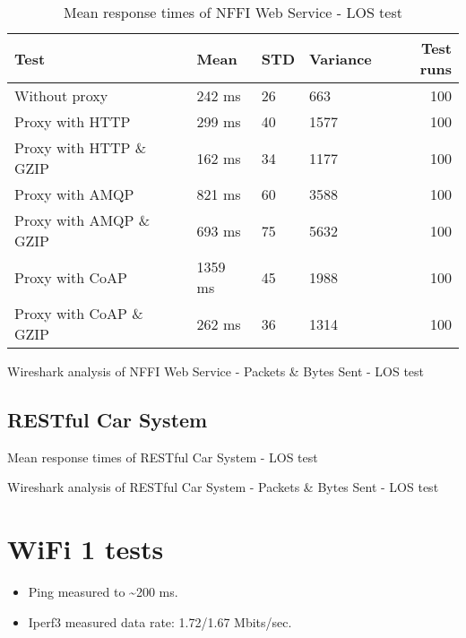 \begin{appendices}
\begin{table}[H]
\begin{tabular}{llllr}
\hline
 Test                   &   Mean &   STD &   Variance &   Test runs \\
\hline
  Without proxy & 242 ms & 26 & 663 & 100 \\
  Proxy with HTTP & 299 ms & 40 & 1577 & 100 \\
  Proxy with HTTP \& GZIP & 162 ms & 34 & 1177 & 100 \\
  Proxy with AMQP & 821 ms & 60 & 3588 & 100 \\
  Proxy with AMQP \& GZIP & 693 ms & 75 & 5632 & 100\\
  Proxy with CoAP & 1359 ms & 45 & 1988 & 100 \\
  Proxy with CoAP \& GZIP & 262 ms & 36 & 1314 & 100 \\
\end{tabular}
\caption{Mean response times of NFFI Web Service - LOS test}
\end{table}

\begin{table}[H]

\caption{Wireshark analysis of NFFI Web Service - Packets \& Bytes Sent - LOS test}
\end{table}


\subsection{RESTful Car System}

\begin{table}[H]

\caption{Mean response times of RESTful Car System - LOS test}
\end{table}

\begin{table}[H]

\caption{Wireshark analysis of RESTful Car System - Packets \& Bytes Sent - LOS test}
\end{table}


\section{WiFi 1 tests}

\begin{itemize}
	\item Ping measured to \textasciitilde 200 ms.
	\item Iperf3 measured data rate: 1.72/1.67 Mbits/sec.
\end{itemize}



\end{appendices}
